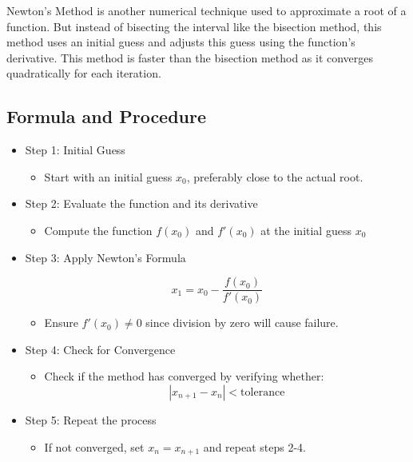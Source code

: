 \documentclass[9pt]{extarticle}
\begin{document}
Newton's Method is another numerical technique used to approximate a root of a function. But instead of bisecting the interval like the bisection method, this method uses an initial guess and adjusts this guess using the function's derivative. This method is faster than the bisection method as it converges quadratically for each iteration.

\subsection{Formula and Procedure}

\begin{itemize}
    \item Step 1: Initial Guess    
        \begin{itemize}
            \item Start with an initial guess \(x_0\), preferably close to the actual root.
        \end{itemize}

    \item Step 2: Evaluate the function and its derivative
        \begin{itemize}
            \item Compute the function \(f(x_0)\) and \(f'(x_0)\) at the initial guess \(x_0\)
        \end{itemize}

    \item Step 3: Apply Newton's Formula

        \[
        x_1 = x_0 - \frac{f(x_0)}{f'(x_0)}
        \]
        \begin{itemize}
            \item Ensure \(f'(x_0) \neq 0\) since division by zero will cause failure.
        \end{itemize}

    \item Step 4: Check for Convergence
        \begin{itemize}
            \item Check if the method has converged by verifying whether:
            \[
            |x_{n+1} - x_n| < \text{tolerance}
            \]
        \end{itemize}

    \item Step 5: Repeat the process
        \begin{itemize}
            \item If not converged, set \(x_n = x_{n+1}\) and repeat steps 2-4.
        \end{itemize}
\end{itemize}
\end{document}
